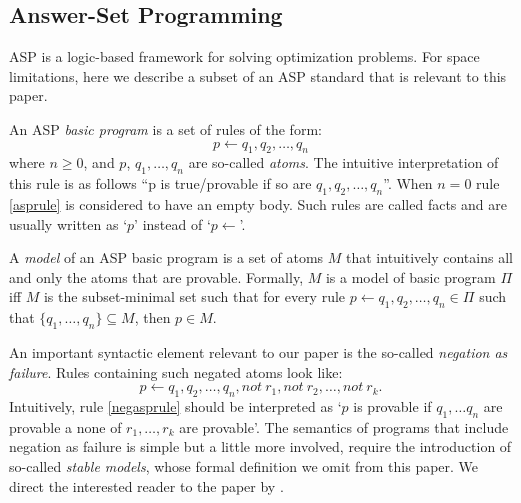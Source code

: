 \subsection{Answer-Set Programming}
ASP \cite{Lifschitz08} is a logic-based framework for solving optimization problems. For space limitations, here we describe a subset of an ASP standard that is relevant to this paper. 

An ASP \emph{basic program} is a set of rules of the form:
\begin{equation}\label{asprule}
p\leftarrow q_1,q_2,\ldots,q_n
\end{equation}
where $n\geq 0$, and $p$, $q_1,\ldots,q_n$ are so-called \emph{atoms}. The intuitive interpretation of this rule is as follows ``p is true/provable if so are $q_1,q_2,\ldots,q_n$''. When $n=0$ rule \eqref{asprule} is considered to have an empty body. Such rules are called facts and are usually written as `$p$' instead of `$p\leftarrow $'.

A \emph{model} of an ASP basic program is a set of atoms $M$ that intuitively contains all and only the atoms that are provable. Formally, $M$ is a model of basic program $\Pi$ iff $M$ is the subset-minimal set such that for every rule $p\leftarrow q_1,q_2,\ldots,q_n \in \Pi$ such that $\{q_1,\ldots,q_n\}\subseteq M$, then $p\in M$.



An important syntactic element relevant to our paper is the so-called \emph{negation as failure}. Rules containing such negated atoms look like:
\begin{equation}\label{negasprule}
p\leftarrow q_1,q_2,\ldots,q_n, not\: r_1,not\: r_2, \ldots, not\: r_k .
\end{equation}
Intuitively, rule \eqref{negasprule} should be interpreted as `$p$ is provable if $q_1,\ldots q_n$ are provable a none of $r_1,\ldots,r_k$ are provable'. The semantics of programs that include negation as failure is simple but a little more involved, require the introduction of so-called \emph{stable models}, whose formal definition we omit from this paper. We direct the interested reader to the paper by .


